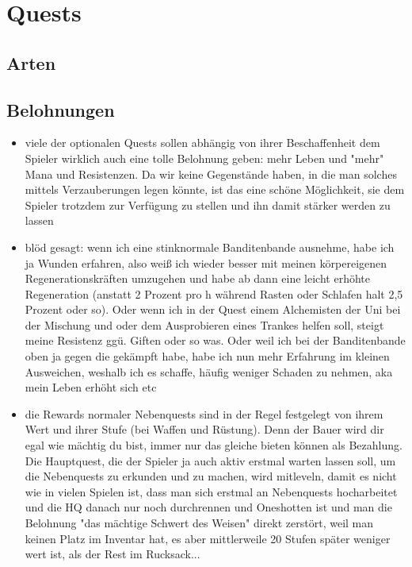 \chapter{Quests}

\section{Arten}

\section{Belohnungen}
\begin{itemize}
	\item viele der optionalen Quests sollen abhängig von ihrer Beschaffenheit dem Spieler wirklich auch eine tolle Belohnung geben: mehr Leben und "mehr" Mana und Resistenzen. Da wir keine Gegenstände haben, in die man solches mittels Verzauberungen legen könnte, ist das eine schöne Möglichkeit, sie dem Spieler trotzdem zur Verfügung zu stellen und ihn damit stärker werden zu lassen
	\item  blöd gesagt: wenn ich eine stinknormale Banditenbande ausnehme, habe ich ja Wunden erfahren, also weiß ich wieder besser mit meinen körpereigenen Regenerationskräften umzugehen und habe ab dann eine leicht erhöhte Regeneration (anstatt 2 Prozent pro h während Rasten oder Schlafen halt 2,5 Prozent oder so). Oder wenn ich in der Quest einem Alchemisten der Uni bei der Mischung und oder dem Ausprobieren eines Trankes helfen soll, steigt meine Resistenz ggü. Giften oder so was. Oder weil ich bei der Banditenbande oben ja gegen die gekämpft habe, habe ich nun mehr Erfahrung im kleinen Ausweichen, weshalb ich es schaffe, häufig weniger Schaden zu nehmen, aka mein Leben erhöht sich etc
	\item  die Rewards normaler Nebenquests sind in der Regel festgelegt von ihrem Wert und ihrer Stufe (bei Waffen und Rüstung). Denn der Bauer wird dir egal wie mächtig du bist, immer nur das gleiche bieten können als Bezahlung. Die Hauptquest, die der Spieler ja auch aktiv erstmal warten lassen soll, um die Nebenquests zu erkunden und zu machen,  wird mitleveln, damit es nicht wie in vielen Spielen ist, dass man sich erstmal an Nebenquests hocharbeitet und die HQ danach nur noch durchrennen und Oneshotten ist und man die Belohnung "das mächtige Schwert des Weisen" direkt zerstört, weil man keinen Platz im Inventar hat, es aber mittlerweile 20 Stufen später weniger wert ist, als der Rest im Rucksack...
\end{itemize}
